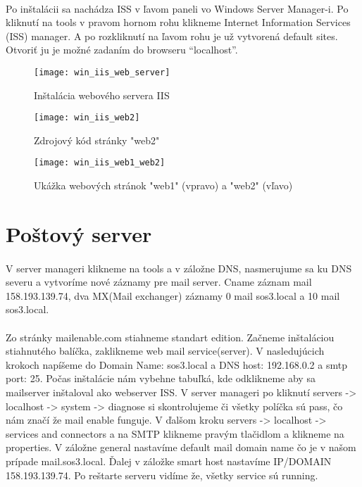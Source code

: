 \paragraph{}
Po inštalácii sa nachádza ISS v ľavom paneli vo Windows Server Manager-i. Po kliknutí na tools v pravom hornom rohu klikneme Internet Information Services (ISS) manager. A po rozkliknutí na ľavom rohu je už vytvorená default sites. Otvoriť ju je možné zadaním do browseru “localhost”.

\begin{figure}[!htb]
\centering
\texttt{[image: win\_iis\_web\_server]}
\caption{Inštalácia webového servera IIS}
\label{fig:x win_web}
\end{figure}

\begin{figure}[!htb]
\centering
\texttt{[image: win\_iis\_web2]}
\caption{Zdrojový kód stránky "web2"}
\label{fig:x win_web2_source}
\end{figure}

\begin{figure}[!htb]
\centering
\texttt{[image: win\_iis\_web1\_web2]}
\caption{Ukážka webových stránok "web1" (vpravo) a "web2" (vľavo)}
\label{fig:x win_web}
\end{figure}

\section{Poštový server}
\paragraph{}
V server manageri klikneme na tools a v záložne DNS, nasmerujume sa ku DNS severu a vytvoríme nové záznamy pre mail server. Cname záznam mail 158.193.139.74, dva MX(Mail exchanger) záznamy 0 mail sos3.local a 10 mail sos3.local.
\paragraph{}
Zo stránky mailenable.com stiahneme standart edition. Začneme inštaláciou stiahnutého balíčka, zaklikneme web mail service(server). V nasledujúcich krokoch napí\-šeme do Domain Name: sos3.local a DNS host: 192.168.0.2 a smtp port: 25. Počas inštalácie nám vybehne tabuľká, kde odklikneme aby sa mailserver inštaloval ako webserver ISS. V server manageri po kliknutí servers -\textgreater{} localhost -\textgreater{} system -\textgreater{} diagnose si skontrolujeme či všetky políčka sú pass, čo nám značí že mail enable funguje. V ďalšom kroku servers -\textgreater{} localhost -\textgreater{} services and connectors  a na SMTP klikneme pravým tlačidlom a klikneme na properties. V záložne general nastavíme default mail domain name čo je v našom prípade mail.sos3.local. Ďalej v záložke smart host nastavíme IP/DOMAIN 158.193.139.74. Po reštarte serveru vidíme že, všetky service sú running.

